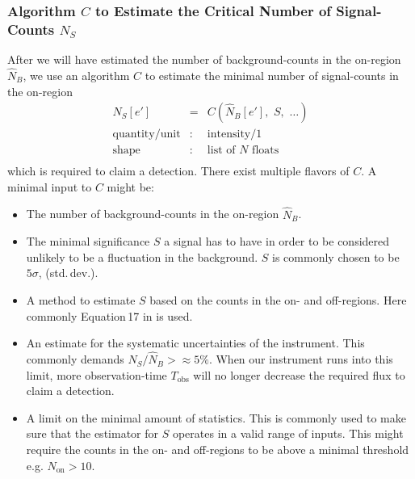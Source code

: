 \documentclass{article}%
\begin{document}
        \subsubsection*{Algorithm $C$ to Estimate the Critical Number of Signal-Counts $N_S$}
            After we will have estimated the number of background-counts in the on-region $\hat{N}_B$, we use an algorithm $C$ to estimate the minimal number of signal-counts in the on-region
            \begin{eqnarray*}
                N_S[e'] &=& C(\hat{N}_B[e'],\,\,S,\,\,\dots)\\
                \text{quantity}/\text{unit} &:& \text{intensity}/1\\
                \text{shape} &:& \text{list of}\,\,N\,\,\text{floats}\\
            \end{eqnarray*}
            which is required to claim a detection.
            There exist multiple flavors of $C$.
            A minimal input to $C$ might be:
            \begin{itemize}
                \item{} The number of background-counts in the on-region $\hat{N}_B$.
                \item{} The minimal significance $S$ a signal has to have in order to be considered unlikely to be a fluctuation in the background.
                $S$ is commonly chosen to be $5\sigma$, (std.\,dev.).
                \item{} A method to estimate $S$ based on the counts in the on- and off-regions. Here commonly Equation\,17 in \cite{li1983analysis} is used.
                \item{} An estimate for the systematic uncertainties of the instrument. This commonly demands $N_S/\hat{N}_B >\approx 5\%$.
                When our instrument runs into this limit, more observation-time $T_\text{obs}$ will no longer decrease the required flux to claim a detection.
                \item{}
                A limit on the minimal amount of statistics. This is commonly used to make sure that the estimator for $S$ operates in a valid range of inputs.
                This might require the counts in the on- and off-regions to be above a minimal threshold e.g. $N_\text{on} > 10$.
            \end{itemize}
\end{document}
